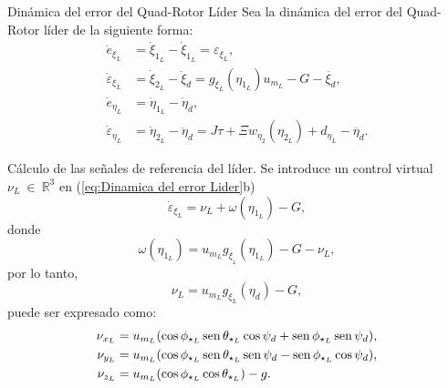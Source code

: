 \documentclass[hyperref={pdfpagelabels=false}]{beamer}
\begin{document}
\begin{frame}{Dinámica del error del Quad-Rotor Líder} 
Sea la dinámica del error del Quad-Rotor líder de la siguiente forma:
\begin{subequations}
  \begin{align}
	\dot{e}_{\xi_L}            &= \dot{\xi}_{1_L}  - \dot{\xi}_{1_L}= \varepsilon_{\xi_L}, \\ 
	\dot{\varepsilon}_{\xi_L}  &= \dot{\xi}_{2_L}  - \ddot{\xi}_{d} =g_{\xi_{L}}(\eta_{1_L})u_{m_L}-G-\ddot{\xi_{d}},\\ 
	\dot{e}_{\eta_L}           &= \dot{\eta}_{1_L} - \dot{\eta}_{d},\\ \label{eq:Dinamica del error Lider c}
	\dot{\varepsilon}_{\eta_L} &= \dot{\eta}_{2_L} - \ddot{\eta}_d = J\tau+\Xi w_{\eta_2}(\eta_{2_L})+d_{\eta_L} -\ddot{\eta_d}.
  \end{align}\label{eq:Dinamica del error Lider}
\end{subequations}

\end{frame}

\begin{frame}{Cálculo de las señales de referencia del líder.} 
Se introduce un control virtual $\nu_L~ \in~\mathbb{R}^3 $ en (\ref{eq:Dinamica del error Lider}b) 
\begin{equation}
\dot{\varepsilon}_{\xi_L} = \nu_L + \omega(\eta_{1_L}) - G,
\end{equation}
donde
\begin{equation*}
    \omega(\eta_{1_L}) = u_{m_L}  g_{\xi_{_L}}(\eta_{1_L}) - G -\nu_L,
\end{equation*}
por lo tanto,
\begin{equation*}
    \nu_L =u_{m_L}  g_{\xi_{L}}(\eta_{d}) - G,
\end{equation*}
puede ser expresado como:
\begin{subequations}
  \begin{align}
\nu_{x_L} &= u_{m_L} (\cos{\phi_{\star_L}}\operatorname{sen}{\theta_{\star_L}}\cos{\psi_{d}} + \operatorname{sen}{\phi_{\star_L}}\operatorname{sen}{\psi_{d}}),\\
\nu_{y_L} &= u_{m_L}(\cos{\phi_{\star_L}}\operatorname{sen}{\theta_{\star_L}}\operatorname{sen}{\psi_{d}} - \operatorname{sen}{\phi_{\star_L}}\cos{\psi_{d}}),\\
\nu_{z_L} &= u_{m_L}(\cos{\phi_{\star_L}}\cos{\theta_{\star_L}})-g.
  \end{align}\label{eq:nulid}
\end{subequations}
\end{frame}
\end{document}
